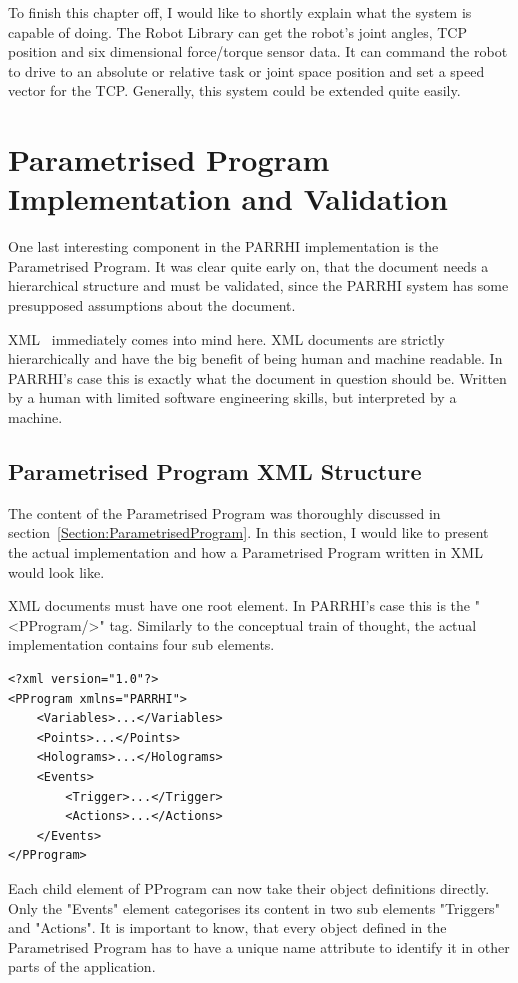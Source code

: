 To finish this chapter off, I would like to shortly explain what the system is capable of doing. The Robot Library can get the robot's joint angles, TCP position and six dimensional force/torque sensor data. It can command the robot to drive to an absolute or relative task or joint space position and set a speed vector for the TCP. Generally, this system could be extended quite easily.

\section{Parametrised Program Implementation and Validation}
One last interesting component in the PARRHI implementation is the Parametrised Program. It was clear quite early on, that the document needs a hierarchical structure and must be validated, since the PARRHI system has some presupposed assumptions about the document.  

XML~\cite{xmlW3C} immediately comes into mind here. XML documents are strictly hierarchically and have the big benefit of being human and machine readable. In PARRHI's case this is exactly what the document in question should be. Written by a human with limited software engineering skills, but interpreted by a machine.


\subsection{Parametrised Program XML Structure}
The content of the Parametrised Program was thoroughly discussed in section~\ref{Section:ParametrisedProgram}. In this section, I would like to present the actual implementation and how a Parametrised Program written in XML would look like.

XML documents must have one root element. In PARRHI's case this is the "<PProgram/>" tag. Similarly to the conceptual train of thought, the actual implementation contains four sub elements.

\begin{lstlisting}
<?xml version="1.0"?>
<PProgram xmlns="PARRHI">
	<Variables>...</Variables>
	<Points>...</Points>
	<Holograms>...</Holograms>
	<Events>
		<Trigger>...</Trigger>
		<Actions>...</Actions>
	</Events>
</PProgram>
\end{lstlisting}

Each child element of PProgram can now take their object definitions directly. Only the "Events" element categorises its content in two sub elements "Triggers" and "Actions". It is important to know, that every object defined in the Parametrised Program has to have a unique name attribute to identify it in other parts of the application. 

